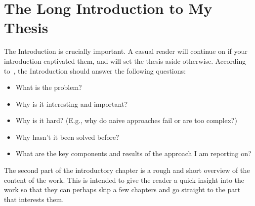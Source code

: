\chapter[Introduction]{The Long Introduction to My Thesis}

The Introduction is crucially important. A casual reader will continue on if your
introduction captivated them, and will set the thesis aside otherwise. According
to~\cite{JW06}, the Introduction should answer the following questions:
\begin{itemize}
    \item What is the problem?
    \item Why is it interesting and important?
    \item Why is it hard? (E.g., why do naive approaches fail or are too complex?)
    \item Why hasn't it been solved before?
    \item What are the key components and results of the approach I am reporting on? 
\end{itemize}

The second part of the introductory chapter is a rough and short overview of the content
of the work. This is intended to give the reader a quick insight into the work so that
they can perhaps skip a few chapters and go straight to the part that interests them.

